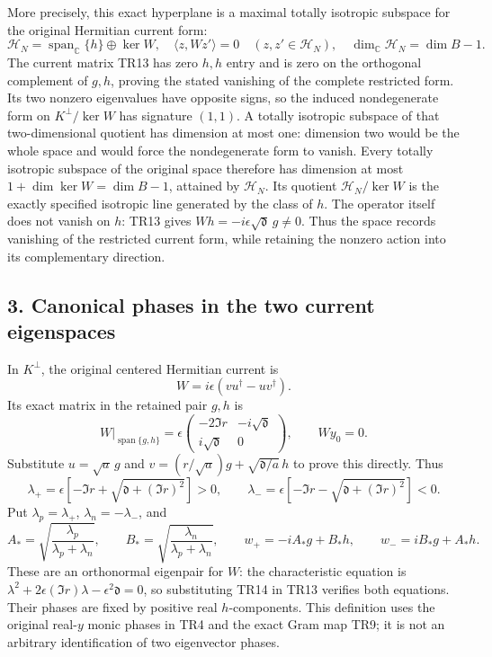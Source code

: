 \documentclass[10pt]{article}
\begin{document}
More precisely, this exact hyperplane is a maximal totally isotropic subspace for the original Hermitian current form: \[
\boxed{\mathcal H_N=\operatorname{span}_{\mathbb C}\{h\}\oplus\ker W,\quad
\langle z,Wz'\rangle=0\quad(z,z'\in\mathcal H_N),\quad
\dim_{\mathbb C}\mathcal H_N=\dim B-1.}
\tag{TR12a}
\] The current matrix TR13 has zero \(h,h\) entry and is zero on the orthogonal complement of \(g,h\), proving the stated vanishing of the complete restricted form. Its two nonzero eigenvalues have opposite signs, so the induced nondegenerate form on \(K^\perp/\ker W\) has signature \((1,1)\). A totally isotropic subspace of that two-dimensional quotient has dimension at most one: dimension two would be the whole space and would force the nondegenerate form to vanish. Every totally isotropic subspace of the original space therefore has dimension at most \(1+\dim\ker W=\dim B-1\), attained by \(\mathcal H_N\). Its quotient \(\mathcal H_N/\ker W\) is the exactly specified isotropic line generated by the class of \(h\). The operator itself does not vanish on \(h\): TR13 gives \(Wh=-i\epsilon\sqrt{\mathfrak d}\,g\ne0\). Thus the space records vanishing of the restricted current form, while retaining the nonzero action into its complementary direction.

\subsection{3. Canonical phases in the two current eigenspaces}\label{canonical-phases-in-the-two-current-eigenspaces}

In \(K^\perp\), the original centered Hermitian current is \[
W=i\epsilon(vu^\dagger-uv^\dagger).
\] Its exact matrix in the retained pair \(g,h\) is \[
W\big|_{\operatorname{span}\{g,h\}}=
\epsilon\begin{pmatrix}-2\Im r&-i\sqrt{\mathfrak d}\\
i\sqrt{\mathfrak d}&0\end{pmatrix},
\qquad W y_0=0.
\tag{TR13}
\] Substitute \(u=\sqrt a\,g\) and \(v=(r/\sqrt a)g+\sqrt{\mathfrak d/a}\,h\) to prove this directly. Thus \[
\lambda_+=\epsilon[-\Im r+\sqrt{\mathfrak d+(\Im r)^2}]>0,\qquad
\lambda_-=\epsilon[-\Im r-\sqrt{\mathfrak d+(\Im r)^2}]<0.
\] Put \(\lambda_p=\lambda_+\), \(\lambda_n=-\lambda_-\), and \[
A_*=\sqrt{\frac{\lambda_p}{\lambda_p+\lambda_n}},\qquad
B_*=\sqrt{\frac{\lambda_n}{\lambda_p+\lambda_n}},\qquad
w_+=-iA_*g+B_*h,\qquad
w_-=iB_*g+A_*h.
\tag{TR14}
\] These are an orthonormal eigenpair for \(W\): the characteristic equation is \(\lambda^2+2\epsilon(\Im r)\lambda-\epsilon^2\mathfrak d=0\), so substituting TR14 in TR13 verifies both equations. Their phases are fixed by positive real \(h\)-components. This definition uses the original real-\(y\) monic phases in TR4 and the exact Gram map TR9; it is not an arbitrary identification of two eigenvector phases.
\end{document}
